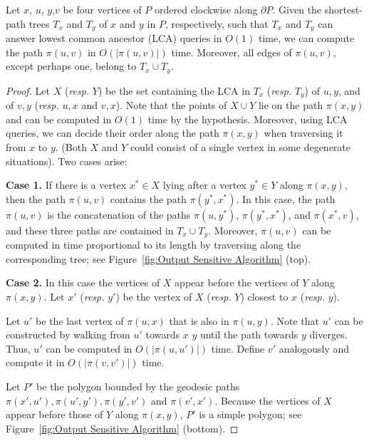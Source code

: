 \documentclass[a4paper,UKenglish]{lipics}
\newcommand{\p}[2]{\ensuremath{\pi(#1, #2)}}
\begin{document}
\begin{lemma}\label{lemma:Suri's lemma}
Let $x$, $u$, $y$,$v$ be four vertices of $P$ ordered clockwise along $\partial P$.
Given the shortest-path trees $T_x$ and $T_y$ of $x$ and $y$ in $P$, respectively, such that $T_x$ and $T_y$ can answer lowest common ancestor (LCA) queries in $O(1)$ time, 
we can compute the path $\p{u}{v}$ in $O(|\p{u}{v}|)$ time. 
Moreover, all edges of $\p{u}{v}$, except perhaps one, belong to $T_x\cup T_y$.
\end{lemma}
\begin{proof}
Let $X$ (\emph{resp.} $Y$) be the set containing the LCA in $T_x$ (\emph{resp.} $T_y$) of $u,y$, and of $v,y$ (\emph{resp.} $u,x$ and $v, x$). Note that the points of $X\cup Y$ lie on the path $\p{x}{y}$ and can be computed in $O(1)$ time by the hypothesis. Moreover, using LCA queries, we can decide their order along the path $\p{x}{y}$ when traversing it from $x$ to $y$. (Both $X$ and $Y$ could consist of a single vertex in some degenerate situations). Two cases arise: 

\textbf{Case 1.} If there is a vertex  $x^*\in X$ lying after a vertex $y^*\in Y$ along $\p{x}{y}$, 
then the path $\p{u}{v}$ contains the path $\p{y^*}{x^*}$. 
In this case, the path $\p{u}{v}$ is the concatenation of the paths $\p{u}{y^*}$, $\p{y^*}{x^*}$, and $\p{x^*}{v}$, and these three paths are contained in $T_x \cup T_y$.
Moreover, $\p{u}{v}$ can be computed in time proportional to its length by traversing along the corresponding tree; see Figure~\ref{fig:Output Sensitive Algorithm} (top).

\textbf{Case 2.} In this case the vertices of $X$ appear before the vertices of $Y$ along $\p{x}{y}$.
Let $x'$ (\emph{resp.} $y'$) be the vertex of $X$ (\emph{resp.} $Y$) closest to $x$ (\emph{resp.} $y$). 

Let $u'$ be the last vertex of $\p{u}{x}$ that is also in $\p{u}{y}$.
Note that $u'$ can be constructed by walking from $u'$ towards $x$ $y$ until the path towards $y$ diverges. 
Thus, $u'$ can be computed in $O(|\p{u}{u'}|)$ time. 
Define $v'$ analogously and compute it in $O(|\p{v}{v'}|)$ time.

Let $P'$ be the polygon bounded by the geodesic paths $\p{x'}{u'}, \p{u'}{y'}, \p{y'}{v'}$ and  $\p{v'}{x'}$.
Because the vertices of $X$ appear before those of $Y$ along $\p{x}{y}$, $P'$ is a simple polygon; see Figure~\ref{fig:Output Sensitive Algorithm} (bottom).


\end{proof}
\end{document}
